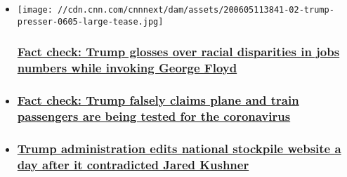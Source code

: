 \begin{itemize}
\item
  \href{/2020/06/05/politics/trump-jobs-presser-fact-check/index.html}{}

  \texttt{[image: //cdn.cnn.com/cnnnext/dam/assets/200605113841-02-trump-presser-0605-large-tease.jpg]}

  \hypertarget{fact-check-trump-glosses-over-racial-disparities-in-jobs-numbers-while-invoking-george-floyd}{%
  \subsubsection{\texorpdfstring{\href{/2020/06/05/politics/trump-jobs-presser-fact-check/index.html}{Fact
  check: Trump glosses over racial disparities in jobs numbers while
  invoking George
  Floyd}}{Fact check: Trump glosses over racial disparities in jobs numbers while invoking George Floyd}}\label{fact-check-trump-glosses-over-racial-disparities-in-jobs-numbers-while-invoking-george-floyd}}
\item
  \hypertarget{fact-check-trump-falsely-claims-plane-and-train-passengers-are-being-tested-for-the-coronavirus}{%
  \subsubsection{\texorpdfstring{\href{/2020/04/02/politics/fact-check-trump-plane-and-train-passengers-tested-for-the-coronavirus/index.html}{Fact
  check: Trump falsely claims plane and train passengers are being
  tested for the
  coronavirus}}{Fact check: Trump falsely claims plane and train passengers are being tested for the coronavirus}}\label{fact-check-trump-falsely-claims-plane-and-train-passengers-are-being-tested-for-the-coronavirus}}
\item
  \hypertarget{trump-administration-edits-national-stockpile-website-a-day-after-it-contradicted-jared-kushner}{%
  \subsubsection{\texorpdfstring{\href{/2020/04/03/politics/stockpile-website-edited-kushner-claim/index.html}{Trump
  administration edits national stockpile website a day after it
  contradicted Jared
  Kushner}}{Trump administration edits national stockpile website a day after it contradicted Jared Kushner}}\label{trump-administration-edits-national-stockpile-website-a-day-after-it-contradicted-jared-kushner}}
\end{itemize}

